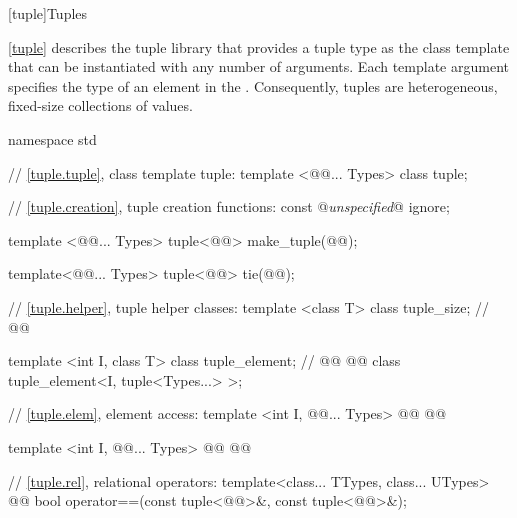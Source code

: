 \documentclass[american,twoside]{book}
\begin{document}
[tuple]{\marktr{}Tuples}

\pnum
{}%
\ref{tuple} describes the tuple library that provides a tuple type as
the class template  that can be instantiated with any number
of arguments.    Each template argument specifies
the type of an element in the .  Consequently, tuples are
heterogeneous, fixed-size collections of values.


\pnum
{}

%
\begin{codeblock}
namespace std {
  // \ref{tuple.tuple}, class template tuple:
  template <@@... Types> class tuple;

  // \ref{tuple.creation}, tuple creation functions:
  const @\textit{unspecified}@ ignore;

  template <@@... Types>
    tuple<@@> make_tuple(@@);

  template<@@... Types>
    tuple<@@> tie(@@); 

  // \ref{tuple.helper}, tuple helper classes:
  template <class T> class tuple_size;  // 
  @@

  template <int I, class T> class tuple_element;    // 
  @@ 
    @@ class tuple_element<I, tuple<Types...> >;

  // \ref{tuple.elem}, element access:
  template <int I, @@... Types> 
    @@
    @@

  template <int I, @@... Types>
    @@
    @@

  // \ref{tuple.rel}, relational operators:
  template<class... TTypes, class... UTypes>
    @@
    bool operator==(const tuple<@@>&, const tuple<@@>&);

}
\end{codeblock}
\end{document}
